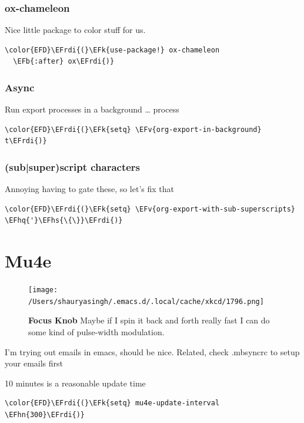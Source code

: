 \documentclass{scrartcl}
\newcommand{\EFk}[1]{\textcolor{EFk}{#1}} %
\newcommand{\EFb}[1]{\textcolor{EFb}{#1}} %
\newcommand{\EFv}[1]{\textcolor{EFv}{#1}} %
\newcommand{\EFhn}[1]{\textcolor{EFhn}{\textbf{#1}}} %
\newcommand{\EFhq}[1]{\textcolor{EFhq}{#1}} %
\newcommand{\EFhs}[1]{\textcolor{EFhs}{#1}} %
\newcommand{\EFrdi}[1]{\textcolor{EFrdi}{#1}} %
\begin{document}
\subsubsection{ox-chameleon}
\label{sec:orge1f4044}
Nice little package to color stuff for us.
\begin{Code}
\begin{Verbatim}[]
\color{EFD}\EFrdi{(}\EFk{use-package!} ox-chameleon
  \EFb{:after} ox\EFrdi{)}
\end{Verbatim}
\end{Code}

\subsubsection{Async}
\label{sec:orgd8f1da7}
Run export processes in a background \ldots{} process
\begin{Code}
\begin{Verbatim}[]
\color{EFD}\EFrdi{(}\EFk{setq} \EFv{org-export-in-background} t\EFrdi{)}
\end{Verbatim}
\end{Code}

\subsubsection{(sub|super)script characters}
\label{sec:orgbcb4292}
Annoying having to gate these, so let's fix that
\begin{Code}
\begin{Verbatim}[]
\color{EFD}\EFrdi{(}\EFk{setq} \EFv{org-export-with-sub-superscripts} \EFhq{'}\EFhs{\{\}}\EFrdi{)}
\end{Verbatim}
\end{Code}

\section{Mu4e}
\label{sec:org04c061e}
\begin{figure}[!htb]
	  \centering
	  \texttt{[image: /Users/shauryasingh/.emacs.d/.local/cache/xkcd/1796.png]}
  \caption*{\label{xkcd:1796} \textbf{Focus Knob} Maybe if I spin it back and forth really fast I can do some kind of pulse-width modulation.}
	\end{figure}
I'm trying out emails in emacs, should be nice. Related, check .mbsyncrc to
setup your emails first

10 minutes is a reasonable update time
\begin{Code}
\begin{Verbatim}[]
\color{EFD}\EFrdi{(}\EFk{setq} mu4e-update-interval \EFhn{300}\EFrdi{)}
\end{Verbatim}
\end{Code}
\end{document}

